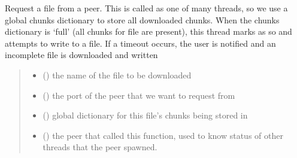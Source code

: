 \documentclass[letterpaper,10pt,english,openany,oneside]{sphinxmanual}
\begin{document}
\begin{fulllineitems}
\begin{fulllineitems}
\end{fulllineitems}


\begin{fulllineitems}
\label{\detokenize{index:transfer.FileTransfer.request_file}}
\pysigstartsignatures
\pysiglinewithargsret
{}
{\sphinxparamcomma {}\sphinxparamcomma {}\sphinxparamcomma {}}
{}
\pysigstopsignatures
\sphinxAtStartPar
Request a file from a peer. This is called as one of many threads, so we use a global chunks dictionary
to store all downloaded chunks. When the chunks dictionary is ‘full’ (all chunks for file are present), this
thread marks as so and attempts to write to a file. If a timeout occurs, the user is notified and an incomplete
file is downloaded and written
\begin{quote}\begin{description}
\begin{itemize}
\item {} 
\sphinxAtStartPar
{} () \textendash{} the name of the file to be downloaded

\item {} 
\sphinxAtStartPar
{} () \textendash{} the port of the peer that we want to request from

\item {} 
\sphinxAtStartPar
{} (\sphinxstyleliteralemphasis{\sphinxupquote{, }}) \textendash{} global dictionary for this file’s chunks being stored in

\item {} 
\sphinxAtStartPar
{} ({\hyperref[\detokenize{index:peer.Peer}]{}}) \textendash{} the peer that called this function, used to know status of other threads that the peer spawned.


\end{itemize}
\end{description}
\end{quote}
\end{fulllineitems}
\end{fulllineitems}
\end{document}
